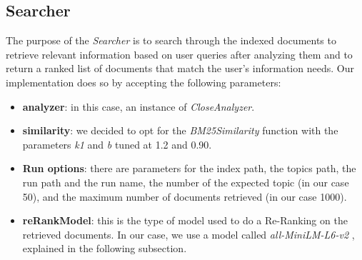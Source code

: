 \subsection{Searcher} \label{searcher_subsec}
The purpose of the \textit{Searcher} is to search through the indexed documents to retrieve relevant information based on user queries after analyzing them and to
return a ranked list of documents that match the user’s information needs.
\newline
Our implementation does so by accepting the following parameters:
\begin{itemize}
  \item \textbf{analyzer}: in this case, an instance of \textit{CloseAnalyzer}.
  \item \textbf{similarity}: we decided to opt for the \textit{BM25Similarity} \cite{lucenebm25similarity} function with the parameters \textit{k1} and \textit{b} tuned at 1.2 and 0.90.
  \item \textbf{Run options}: there are parameters for the index path, the topics path, the run path and the run name, the number of the expected topic (in our case 50), and the maximum number of documents retrieved (in our case 1000).
  \item \textbf{reRankModel}: this is the type of model used to do a Re-Ranking on the retrieved documents. 
  In our case, we use a model called \textit{all-MiniLM-L6-v2} \cite{huggingfaceallminilml6v2}, explained in the following subsection.
\end{itemize}


